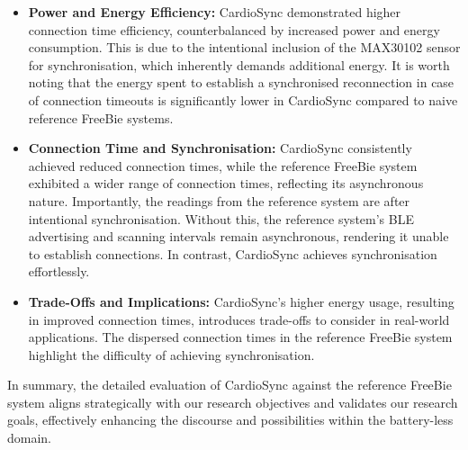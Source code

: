 \begin{itemize}
    \item \textbf{Power and Energy Efficiency:} CardioSync demonstrated higher connection time efficiency, counterbalanced by increased power and energy consumption. This is due to the intentional inclusion of the MAX30102 sensor for synchronisation, which inherently demands additional energy. It is worth noting that the energy spent to establish a synchronised reconnection in case of connection timeouts is significantly lower in CardioSync compared to naive reference FreeBie systems.

    \item \textbf{Connection Time and Synchronisation:} CardioSync consistently achieved reduced connection times, while the reference FreeBie system exhibited a wider range of connection times, reflecting its asynchronous nature. Importantly, the readings from the reference system are after intentional synchronisation. Without this, the reference system's BLE advertising and scanning intervals remain asynchronous, rendering it unable to establish connections. In contrast, CardioSync achieves synchronisation effortlessly.

    \item \textbf{Trade-Offs and Implications:} CardioSync's higher energy usage, resulting in improved connection times, introduces trade-offs to consider in real-world applications. The dispersed connection times in the reference FreeBie system highlight the difficulty of achieving synchronisation.

\end{itemize}

\noindent In summary, the detailed evaluation of CardioSync against the reference FreeBie system aligns strategically with our research objectives and validates our research goals, effectively enhancing the discourse and possibilities within the battery-less domain.